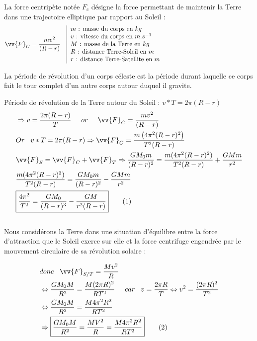 \documentclass[12pt]{article}
\begin{document}
La force centripète notée $F_{c}$ désigne la force permettant de maintenir la Terre dans une trajectoire elliptique par rapport au Soleil : 
\begin{align*}
\vv{F}_{C} &= \frac{mv^{2}}{(R-r)} & \begin{tabular}{|p{10cm}}
$m$ : masse du corps en $kg$ \\
$v$ : vitesse du corps en $m.s^{-1}$ \\
$M$ : masse de la Terre en $kg$ \\
$R$ : distance Terre-Soleil en $m$ \\
$r$ : distance Terre-Satellite en $m$
\end{tabular}
\end{align*}

La période de révolution d'un corps céleste est la période durant laquelle ce corps fait le tour complet d'un autre corps autour duquel il gravite. \par
Période de révolution de la Terre autour du Soleil :    $v*T = 2\pi(R-r)$ \\
\begin{align*}
&\Rightarrow v = \frac{2\pi(R-r)}{T}  \hspace{0.5cm} or \hspace{0.5cm} \vv{F}_{C} = \frac{mv^{2}}{(R-r)} \\
&Or\hspace{0.3cm}v*T = 2\pi(R-r) \Rightarrow \vv{F}_{C} = \frac{m\left(4\pi^{2}(R-r)^{2}\right)}{T^2(R-r)}\\
&\vv{F}_{S} = \vv{F}_{C} + \vv{F}_{T}  \Rightarrow \frac{GM_{0}m}{(R-r)^{2}} = \frac{m(4\pi^{2}(R-r)^{2})}{T^2(R-r)} + \frac{GMm}{r^{2}}\\
&\frac{m(4\pi^{2}(R-r)^{2})}{T^2(R-r)} =  \frac{GM_{0}m}{(R-r)^{2}} - \frac{GMm}{r^{2}} \\
& \boxed{\frac{4\pi^{2}}{T^2} = \frac{GM_0}{(R-r)^3} - \frac{GM}{r^2(R-r)}} \tag{1}
\end{align*} \\
Nous considérons la Terre dans une situation d'équilibre entre la force d'attraction que le Soleil exerce sur elle et la force centrifuge engendrée par le mouvement circulaire de sa révolution solaire : \par
\begin{align*}
&donc\hspace{0.3cm}\vv{F}_{S/T} = \frac{Mv^2}{R} \\
&\Leftrightarrow \frac{GM_{0}M}{R^2} = \frac{M(2\pi R)^2}{RT^2}\hspace{0.5cm}car\hspace{0.3cm}v = \frac{2\pi R}{T} \Leftrightarrow v^2 = \frac{(2\pi R)^2}{T^2} \\
&\Leftrightarrow \frac{GM_{0}M}{R^2} = \frac{M4\pi^2 R^2}{RT^2} \\
&\Rightarrow \boxed{\frac{GM_{0}M}{R^2} = \frac{MV^2}{R} = \frac{M4\pi ^2 R^2}{RT^2}} \tag{2}
\end{align*} \\
\end{document}
